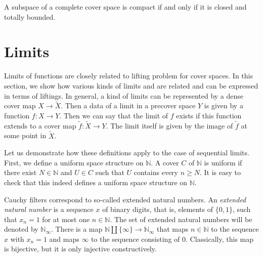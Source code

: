 \documentclass[reqno]{amsart}
\theoremstyle{definition}
\theoremstyle{remark}
\numberwithin{figure}{section}
\begin{document}
\begin{cor}
A subspace of a complete cover space is compact if and only if it is closed and totally bounded.
\end{cor}

\section{Limits}
\label{sec:limits}

Limits of functions are closely related to lifting problem for cover spaces.
In this section, we show how various kinds of limits and are related and can be expressed in terms of liftings.
In general, a kind of limits can be represented by a dense cover map $X \to \widetilde{X}$.
Then a data of a limit in a precover space $Y$ is given by a function $f : X \to Y$.
Then we can say that the limit of $f$ exists if this function extends to a cover map $\widetilde{f} : \widetilde{X} \to Y$.
The limit itself is given by the image of $\widetilde{f}$ at some point in $\widetilde{X}$.

Let us demonstrate how these definitions apply to the case of sequential limits.
First, we define a uniform space structure on $\mathbb{N}$.
A cover $C$ of $\mathbb{N}$ is uniform if there exist $N \in \mathbb{N}$ and $U \in C$ such that $U$ contains every $n \geq N$.
It is easy to check that this indeed defines a uniform space structure on $\mathbb{N}$.

Cauchy filters correspond to so-called extended natural numbers.
An \emph{extended natural number} is a sequence $x$ of binary digits, that is, elements of $\{ 0, 1 \}$, such that $x_n = 1$ for at most one $n \in \mathbb{N}$.
The set of extended natural numbers will be denoted by $\mathbb{N}_\infty$.
There is a map $\mathbb{N} \amalg \{ \infty \} \to \mathbb{N}_\infty$ that maps $n \in \mathbb{N}$ to the sequence $x$ with $x_n = 1$ and maps $\infty$ to the sequence consisting of $0$.
Classically, this map is bijective, but it is only injective constructively.
\end{document}
